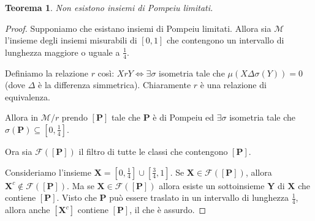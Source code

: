\documentclass[12pt]{article}
\newcommand\ins[1]{\mathbf #1}
\newcommand\pom{di Pompeiu}
\newtheorem{teo}{Teorema}
\theoremstyle{definition}
\begin{document}
\begin{teo}Non esistono insiemi \pom{} limitati.
\end{teo}
\begin{proof}
Supponiamo che esistano insiemi \pom{} limitati. Allora sia $\mathcal M$
l'insieme degli insiemi misurabili di $[0,1]$ che contengono un intervallo
di lunghezza maggiore o uguale a $\frac14$.

Definiamo la relazione $r$ così:
$X r Y \Longleftrightarrow \exists\sigma$ isometria tale che
$\mu(X\Delta\sigma(Y))=0$ (dove $\Delta$ è la differenza simmetrica).
Chiaramente $r$ è una relazione di equivalenza.

Allora in $\mathcal M/r$ prendo $[\ins P]$ tale che $\ins P$ è \pom{} ed
$\exists \sigma$ isometria tale che $\sigma(\ins P)\subseteq\left[0,\frac14\right]$.

Ora sia $\mathcal F([\ins P])$ il filtro di tutte le classi che contengono $[\ins P]$.

Consideriamo l'insieme $\ins X=\left[0,\frac14\right]\cup\left[\frac34,1\right]$.
Se $\ins X \in \mathcal F([\ins P])$, allora $\ins {X^c} \notin \mathcal F([\ins P])$.
Ma se $\ins{X}\in \mathcal F([\ins P])$
allora esiste un sottoinsieme $\ins Y$ di $\ins{X}$ che contiene $[\ins P]$.
Visto che $\ins P$ può essere traslato in un intervallo di lunghezza $\frac14$, allora anche $[\ins {X^c}]$ contiene $[\ins P]$, il che è assurdo.
\end{proof}
\end{document}
